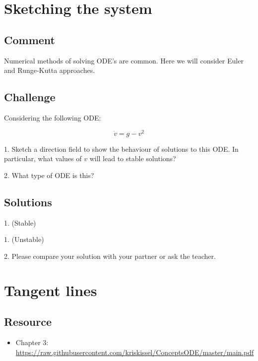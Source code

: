 \section{Sketching the system}
\label{sec:numericalfield}

\subsection*{Comment}
Numerical methods of solving ODE's are common. Here we will consider Euler and Runge-Kutta approaches.

\subsection*{Challenge}

Considering the following ODE:

\begin{equation}
    \dot{v} = g - v^2
\end{equation}

1. Sketch a direction field to show the behaviour of solutions to this ODE. In particular, what values of $v$ will lead to stable solutions?

2. What type of ODE is this?

\subsection*{Solutions}
1. (Stable)\\

1. (Unstable)\\

2. Please compare your solution with your partner or ask the teacher.




\newpage
\section{Tangent lines}

\subsection*{Resource}
\begin{itemize}
    \item Chapter 3: \url{https://raw.githubusercontent.com/kriskissel/ConceptsODE/master/main.pdf}
\end{itemize}

